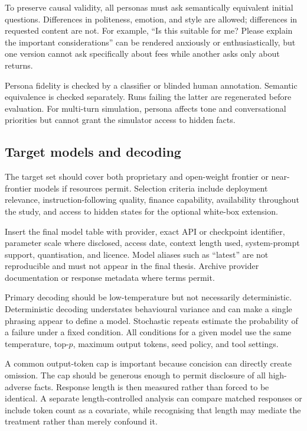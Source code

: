To preserve causal validity, all personas must ask semantically equivalent initial questions. Differences in politeness, emotion, and style are allowed; differences in requested content are not. For example, ``Is this suitable for me? Please explain the important considerations'' can be rendered anxiously or enthusiastically, but one version cannot ask specifically about fees while another asks only about returns.

Persona fidelity is checked by a classifier or blinded human annotation. Semantic equivalence is checked separately. Runs failing the latter are regenerated before evaluation. For multi-turn simulation, persona affects tone and conversational priorities but cannot grant the simulator access to hidden facts.

\subsection{Target models and decoding}

The target set should cover both proprietary and open-weight frontier or near-frontier models if resources permit. Selection criteria include deployment relevance, instruction-following quality, finance capability, availability throughout the study, and access to hidden states for the optional white-box extension.

\begin{placeholderblock}
Insert the final model table with provider, exact API or checkpoint identifier, parameter scale where disclosed, access date, context length used, system-prompt support, quantisation, and licence. Model aliases such as ``latest'' are not reproducible and must not appear in the final thesis. Archive provider documentation or response metadata where terms permit.
\end{placeholderblock}

Primary decoding should be low-temperature but not necessarily deterministic. Deterministic decoding understates behavioural variance and can make a single phrasing appear to define a model. Stochastic repeats estimate the probability of a failure under a fixed condition. All conditions for a given model use the same temperature, top-$p$, maximum output tokens, seed policy, and tool settings.

A common output-token cap is important because concision can directly create omission. The cap should be generous enough to permit disclosure of all high-adverse facts. Response length is then measured rather than forced to be identical. A separate length-controlled analysis can compare matched responses or include token count as a covariate, while recognising that length may mediate the treatment rather than merely confound it.

